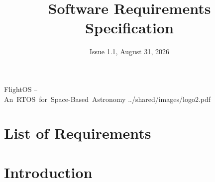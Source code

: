 

\title{Software Requirements Specification}
\def \documentid {FLIGHTOS-UVIE-SRS-001}
\date{Issue 1.1, August 31, 2026}

\newcommand\affil[1]{\textsuperscript#1}

\def\preparedby {Armin Luntzer\affil{1}}
\def\checkedby {Roland Ottensamer\affil{1}}
\def\approvedby {Franz Kerschbaum\affil{1}}
\def\authorisedby{-}

\def\affiliations{
	\affil{1} Department of Astrophysics, University of Vienna
}








\usepackage{vhistory}

\usepackage[
	backend=biber,
	defernumbers,
	natbib=true,
	style=numeric, %
	sorting=none,
]{biblatex}



\rereadauxrequirementlabels

\exportrequirements




\setmainfont{MyriadPro-SemiCondensed}
\uvietitlepage%
{FlightOS --\\\mbox{An RTOS for Space-Based Astronomy}}%
{\doctitle}%
{../shared/images/logo2.pdf}{}
\setmainfont{MyriadPro}

\approvalpage

\tableofcontents
\newpage

\chapter*{List of Requirements}
\the\requirementlist


\begin{versionhistory}
\end{versionhistory}


\chapter{Introduction}


